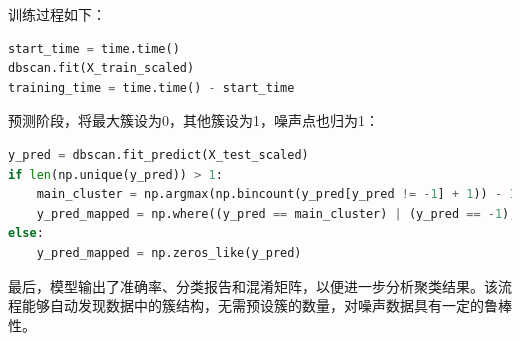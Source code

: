 \documentclass{SYSUReport}
\begin{document}
训练过程如下：

\begin{lstlisting}[language=Python]
start_time = time.time()
dbscan.fit(X_train_scaled)
training_time = time.time() - start_time
\end{lstlisting}

预测阶段，将最大簇设为0，其他簇设为1，噪声点也归为1：

\begin{lstlisting}[language=Python]
y_pred = dbscan.fit_predict(X_test_scaled)
if len(np.unique(y_pred)) > 1:
    main_cluster = np.argmax(np.bincount(y_pred[y_pred != -1] + 1)) - 1
    y_pred_mapped = np.where((y_pred == main_cluster) | (y_pred == -1), 0, 1)
else:
    y_pred_mapped = np.zeros_like(y_pred)
\end{lstlisting}

最后，模型输出了准确率、分类报告和混淆矩阵，以便进一步分析聚类结果。该流程能够自动发现数据中的簇结构，无需预设簇的数量，对噪声数据具有一定的鲁棒性。
\end{document}
